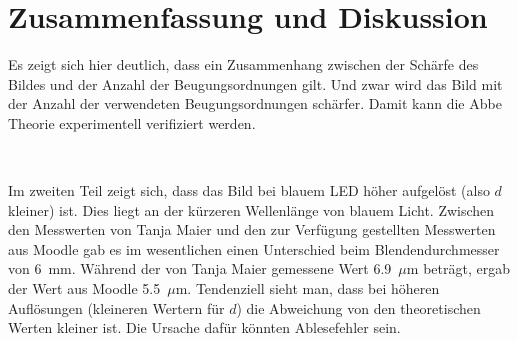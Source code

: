 \documentclass{article}
\begin{document}
\section{Zusammenfassung und Diskussion}

Es zeigt sich hier deutlich, dass ein Zusammenhang zwischen der Schärfe des Bildes und der Anzahl der Beugungsordnungen gilt. Und zwar wird das Bild mit der Anzahl der verwendeten Beugungsordnungen schärfer. Damit kann die Abbe Theorie experimentell verifiziert werden.

~

Im zweiten Teil zeigt sich, dass das Bild bei blauem LED höher aufgelöst (also $d$ kleiner) ist. Dies liegt an der kürzeren Wellenlänge von blauem Licht. Zwischen den Messwerten von Tanja Maier und den zur Verfügung gestellten Messwerten aus Moodle gab es im wesentlichen einen Unterschied beim Blendendurchmesser von 6~mm. Während der von Tanja Maier gemessene Wert 6.9~$\mu$m beträgt, ergab der Wert aus Moodle 5.5~$\mu$m. Tendenziell sieht man, dass bei höheren Auflösungen (kleineren Wertern für $d$) die Abweichung von den theoretischen Werten kleiner ist. Die Ursache dafür könnten Ablesefehler sein.










%

%


%
\end{document}
